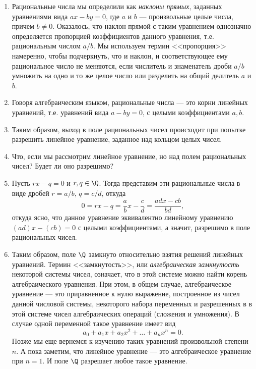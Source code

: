 \begin{enumerate}
\item Рациональные числа мы определили как \textit{наклоны прямых}, заданных уравнениями вида $ax-by=0$, где $a$ и $b$ --- произвольные целые числа, причем $b\ne 0$. Оказалось, что наклон прямой с таким уравнением однозначно определяется пропорцией коэффициентов данного уравнения, т.е. рациональным числом $a/b$. Мы используем термин <<пропорция>> намеренно, чтобы подчеркнуть, что и наклон, и соответствующее ему рациональное число не меняются, если числитель и знаменатель дроби $a/b$ умножить на одно и то же целое число или разделить на общий делитель $a$ и $b$.

\item Говоря алгебраическим языком, рациональные числа --- это корни линейных уравнений, т.е. уравнений вида $a-by=0$, с целыми коэффициентами $a,b$.
\item Таким образом, выход в поле рациональных чисел происходит при попытке разрешить линейное уравнение, заданное над кольцом целых чисел.
\item Что, если мы рассмотрим линейное уравнение, но над полем рациональных чисел? Будет ли оно разрешимо?
\item Пусть $rx-q=0$ и $r,q\in\Q$. Тогда представим эти рациональные числа в виде дробей $r=a/b$, $q=c/d$, откуда
$$
0=rx-q = \frac{a}{b}x-\frac{c}{d} = \frac{adx-cb}{bd},
$$
откуда ясно, что данное уравнение эквивалентно линейному уравнению $(ad)x-(cb)=0$ с целыми коэффициентами, а значит, разрешимо в поле рациональных чисел.
\item Таким образом, поле $\Q$ замкнуто относительно взятия решений линейных уравнений. Термин <<замкнутость>>, или \textit{алгебраическая замкнутость} некоторой системы чисел, означает, что в этой системе можно найти корень алгебраического уравнения. При этом, в общем случае, алгебраическое уравнение --- это приравненное к нулю выражение, построенное из чисел данной числовой системы, некоторого набора переменных и разрешенных в в этой системе чисел алгебраических операций (сложения и умножения). В случае одной переменной такое уравнение имеет вид
$$
a_0 + a_1x + a_2x^2 + \dots + a_nx^n = 0.
$$
Позже мы еще вернемся к изучению таких уравнений произвольной степени $n$. А пока заметим, что линейное уравнение --- это алгебраическое уравнение при $n=1$. И поле $\Q$ разрешает любое такое уравнение.


\end{enumerate}

